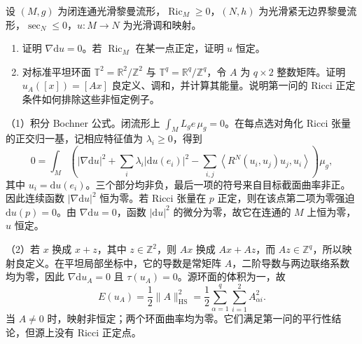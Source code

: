 \begin{exercise}\label{g3:ex:harmonic-map-closed-bochner-rigidity}
	设 \((M,g)\) 为闭连通光滑黎曼流形，\(\operatorname{Ric}_M\ge0\)，\((N,h)\) 为光滑紧无边界黎曼流形，\(\sec_N\le0\)，\(u:M\to N\) 为光滑调和映射。
	\begin{enumerate}
		\item 证明 \(\nabla\mathrm du=0\)。若 \(\operatorname{Ric}_M\) 在某一点正定，证明 \(u\) 恒定。
		\item 对标准平坦环面 \(\mathbb T^2=\mathbb R^2/\mathbb Z^2\) 与 \(\mathbb T^q=\mathbb R^q/\mathbb Z^q\)，令 \(A\) 为 \(q\times2\) 整数矩阵。证明 \(u_A([x])=[Ax]\) 良定义、调和，并计算其能量。说明第一问的 Ricci 正定条件如何排除这些非恒定例子。
	\end{enumerate}
\end{exercise}
\begin{solution}
	（1）积分 Bochner 公式。闭流形上 \(\int_M L_g e\,\mu_g=0\)。在每点选对角化 Ricci 张量的正交归一基，记相应特征值为 \(\lambda_i\ge0\)，得到
	\[
		0=\int_M\left(
		|\nabla\mathrm du|^2
		+\sum_i\lambda_i|\mathrm du(e_i)|^2
		-\sum_{i,j}\left\langle R^N(u_i,u_j)u_j,u_i\right\rangle
		\right)\mu_g,
	\]
	其中 \(u_i=\mathrm du(e_i)\)。三个部分均非负，最后一项的符号来自目标截面曲率非正。因此连续函数 \(|\nabla\mathrm du|^2\) 恒为零。若 Ricci 张量在 \(p\) 正定，则在该点第二项为零强迫 \(\mathrm du(p)=0\)。由 \(\nabla\mathrm du=0\)，函数 \(|\mathrm du|^2\) 的微分为零，故它在连通的 \(M\) 上恒为零，\(u\) 恒定。

	（2）若 \(x\) 换成 \(x+z\)，其中 \(z\in\mathbb Z^2\)，则 \(Ax\) 换成 \(Ax+Az\)，而 \(Az\in\mathbb Z^q\)，所以映射良定义。在平坦局部坐标中，它的导数是常矩阵 \(A\)，二阶导数与两边联络系数均为零，因此 \(\nabla\mathrm du_A=0\) 且 \(\tau(u_A)=0\)。源环面的体积为一，故
	\[
		E(u_A)=\frac12\|A\|_{\mathrm{HS}}^2
		=\frac12\sum_{\alpha=1}^q\sum_{i=1}^2A_{\alpha i}^2.
	\]
	当 \(A\ne0\) 时，映射非恒定；两个环面曲率均为零。它们满足第一问的平行性结论，但源上没有 Ricci 正定点。
\end{solution}

